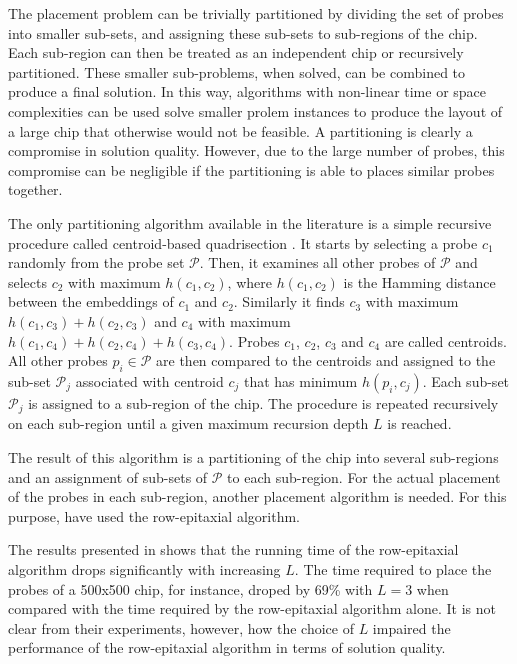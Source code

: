 \documentclass{bioinfo}
\begin{document}
The placement problem can be trivially partitioned by dividing the set of probes into smaller sub-sets, and assigning these sub-sets to sub-regions of the chip. Each sub-region can then be treated as an independent chip or recursively partitioned. These smaller sub-problems, when solved, can be combined to produce a final solution. In this way, algorithms with non-linear time or space complexities can be used solve smaller prolem instances to produce the layout of a large chip that otherwise would not be feasible. A partitioning is clearly a compromise in solution quality. However, due to the large number of probes, this compromise can be negligible if the partitioning is able to places similar probes together.

The only partitioning algorithm available in the literature is a simple recursive procedure called centroid-based quadrisection \citep{KAHNG03_1}. It starts by selecting a probe $c_1$ randomly from the probe set $\mathcal{P}$. Then, it examines all other probes of $\mathcal{P}$ and selects $c_2$ with maximum $h(c_1,c_2)$, where $h(c_1,c_2)$ is the Hamming distance between the embeddings of $c_1$ and $c_2$. Similarly it finds $c_3$ with maximum $h(c_1,c_3) + h(c_2,c_3)$ and $c_4$ with maximum $h(c_1,c_4) + h(c_2,c_4) + h(c_3,c_4)$. Probes $c_1$, $c_2$, $c_3$ and $c_4$ are called centroids. All other probes $p_i \in \mathcal{P}$ are then compared to the centroids and assigned to the sub-set $\mathcal{P}_j$ associated with centroid $c_j$ that has minimum $h(p_i,c_j)$. Each sub-set $\mathcal{P}_j$ is assigned to a sub-region of the chip. The procedure is repeated recursively on each sub-region until a given maximum recursion depth $L$ is reached.

The result of this algorithm is a partitioning of the chip into several sub-regions and an assignment of sub-sets of $\mathcal{P}$ to each sub-region. For the actual placement of the probes in each sub-region, another placement algorithm is needed. For this purpose, \citealp{KAHNG03_1} have used the row-epitaxial algorithm.

The results presented in \citealp{KAHNG03_1} shows that the running time of the row-epitaxial algorithm drops significantly with increasing $L$. The time required to place the probes of a 500x500 chip, for instance, droped by 69\% with $L = 3$ when compared with the time required by the row-epitaxial algorithm alone. It is not clear from their experiments, however, how the choice of $L$ impaired the performance of the row-epitaxial algorithm in terms of solution quality.
\end{document}
